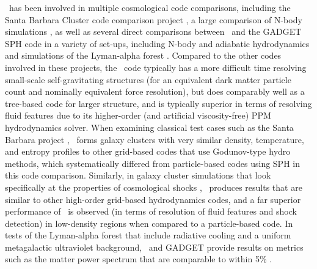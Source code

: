 \enzo\ has been involved in multiple cosmological code comparisons,
including the Santa Barbara Cluster code comparison project
\citep{SantaBarbara}, a large comparison of N-body simulations
\citep{2008CS&D....1a5003H}, as well as several direct comparisons
between \enzo\ and the GADGET SPH code in a variety of set-ups,
including N-body and adiabatic hydrodynamics
\citep{2005ApJS..160....1O,2005MNRAS.364..909V, 2011MNRAS.418..960V}
and simulations of the Lyman-alpha forest \citep{2007MNRAS.374..196R}.
Compared to the other codes involved in these projects, the \enzo\
code typically has a more difficult time resolving small-scale
self-gravitating structures (for an equivalent dark matter particle
count and nominally equivalent force resolution), but does comparably
well as a tree-based code for larger structure, and is typically
superior in terms of resolving fluid features due to its higher-order
(and artificial viscosity-free) PPM hydrodynamics solver.  When
examining classical test cases such as the Santa Barbara project
\citep{SantaBarbara}, \enzo\ forms galaxy clusters with very similar
density, temperature, and entropy profiles to other grid-based codes
that use Godunov-type hydro methods, which systematically differed
from particle-based codes using SPH in this code comparison.
Similarly, in galaxy cluster simulations that look specifically at the
properties of cosmological shocks \citep[e.g.][]{2011MNRAS.418..960V},
\enzo\ produces results that are similar to other high-order
grid-based hydrodynamics codes, and a far superior performance of
\enzo\ is observed (in terms of resolution of fluid features and shock
detection) in low-density regions when compared to a particle-based
code.  In tests of the Lyman-alpha forest that include radiative
cooling and a uniform metagalactic ultraviolet background, \enzo\ and
GADGET provide results on metrics such as the matter power spectrum
that are comparable to within 5\% \citep{2007MNRAS.374..196R}.

